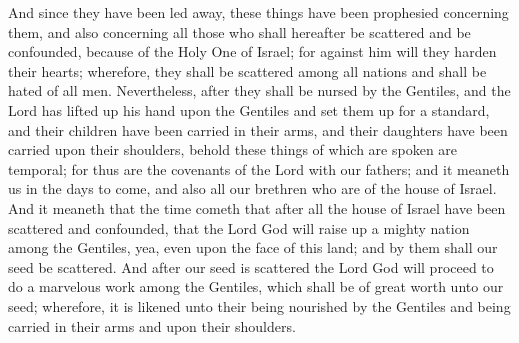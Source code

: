 And since they have been led away, these things have been prophesied concerning them, and also concerning all those who shall hereafter be scattered and be confounded, because of the Holy One of Israel; for against him will they harden their hearts; wherefore, they shall be scattered among all nations and shall be hated of all men.
\bverse \iffalse Nevertheless, after they shall be nursed by the Gentiles, and the Lord has lifted up his hand upon the Gentiles and set them up for a standard, and their children have been carried in their arms, and their daughters have been carried upon their shoulders, behold these things of which are spoken are temporal; for thus are the covenants of the Lord with our fathers; and it meaneth us in the days to come, and also all our brethren who are of the house of Israel. \fi
Nevertheless, after they shall be nursed by the Gentiles, and the Lord has lifted up his hand upon the Gentiles and set them up for a standard, and their children have been carried in their arms, and their daughters have been carried upon their shoulders, behold these things of which are spoken are temporal; for thus are the covenants of the Lord with our fathers; and it meaneth us in the days to come, and also all our brethren who are of the house of Israel.
\bverse \iffalse And it meaneth that the time cometh that after all the house of Israel have been scattered and confounded, that the Lord God will raise up a mighty nation among the Gentiles, yea, even upon the face of this land; and by them shall our seed be scattered. \fi
And it meaneth that the time cometh that after all the house of Israel have been scattered and confounded, that the Lord God will raise up a mighty nation among the Gentiles, yea, even upon the face of this land; and by them shall our seed be scattered.
\bverse \iffalse And after our seed is scattered the Lord God will proceed to do a marvelous work among the Gentiles, which shall be of great worth unto our seed; wherefore, it is likened unto their being nourished by the Gentiles and being carried in their arms and upon their shoulders. \fi
And after our seed is scattered the Lord God will proceed to do a marvelous work among the Gentiles, which shall be of great worth unto our seed; wherefore, it is likened unto their being nourished by the Gentiles and being carried in their arms and upon their shoulders.
\bverse \iffalse And it shall also be of worth unto the Gentiles; and not only unto the Gentiles but unto all the house of Israel, unto the making known of the covenants of the Father of heaven unto Abraham, saying: In thy seed shall all the kindreds of the earth be blessed. \fi
